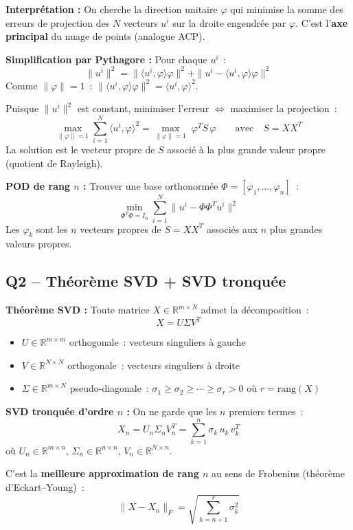 \documentclass[11pt,a4paper]{article}
\begin{document}
\begin{formulabox}[Solution]
\textbf{Interpr\'etation :} On cherche la direction unitaire $\varphi$ qui minimise la somme des erreurs de projection des $N$ vecteurs $u^i$ sur la droite engendr\'ee par $\varphi$. C'est l'\textbf{axe principal} du nuage de points (analogue ACP).

\medskip
\textbf{Simplification par Pythagore :} Pour chaque $u^i$~:
\[
\|u^i\|^2 = \|\langle u^i,\varphi\rangle\varphi\|^2 + \|u^i - \langle u^i,\varphi\rangle\varphi\|^2
\]
Comme $\|\varphi\|=1$~: $\|\langle u^i,\varphi\rangle\varphi\|^2 = \langle u^i,\varphi\rangle^2$.

Puisque $\|u^i\|^2$ est constant, minimiser l'erreur $\Leftrightarrow$ maximiser la projection~:
\[
\boxed{\max_{\|\varphi\|=1} \sum_{i=1}^{N} \langle u^i,\varphi\rangle^2 = \max_{\|\varphi\|=1}\; \varphi^T S\,\varphi} \qquad\text{avec}\quad S = XX^T
\]
La solution est le vecteur propre de $S$ associ\'e \`a la plus grande valeur propre (quotient de Rayleigh).

\medskip
\textbf{POD de rang $n$ :} Trouver une base orthonorm\'ee $\Phi = [\varphi_1,\ldots,\varphi_n]$~:
\[
\boxed{\min_{\Phi^T\Phi = I_n} \sum_{i=1}^{N} \|u^i - \Phi\Phi^Tu^i\|^2}
\]
Les $\varphi_k$ sont les $n$ vecteurs propres de $S = XX^T$ associ\'es aux $n$ plus grandes valeurs propres.
\end{formulabox}

\subsection{Q2 -- Th\'eor\`eme SVD + SVD tronqu\'ee}

\begin{formulabox}[Solution]
\textbf{Th\'eor\`eme SVD :} Toute matrice $X \in \mathbb{R}^{m\times N}$ admet la d\'ecomposition~:
\[
\boxed{X = U\Sigma V^T}
\]
\begin{itemize}[nosep]
\item $U \in \mathbb{R}^{m\times m}$ orthogonale~: vecteurs singuliers \`a gauche
\item $V \in \mathbb{R}^{N\times N}$ orthogonale~: vecteurs singuliers \`a droite
\item $\Sigma \in \mathbb{R}^{m\times N}$ pseudo-diagonale~: $\sigma_1 \geq \sigma_2 \geq \cdots \geq \sigma_r > 0$ o\`u $r = \text{rang}(X)$
\end{itemize}

\medskip
\textbf{SVD tronqu\'ee d'ordre $n$ :} On ne garde que les $n$ premiers termes~:
\[
\boxed{X_n = U_n\Sigma_n V_n^T = \sum_{k=1}^{n} \sigma_k\, u_k\, v_k^T}
\]
o\`u $U_n \in \mathbb{R}^{m\times n}$, $\Sigma_n \in \mathbb{R}^{n\times n}$, $V_n \in \mathbb{R}^{N\times n}$.

C'est la \textbf{meilleure approximation de rang $n$} au sens de Frobenius (th\'eor\`eme d'Eckart--Young)~:
\[
\|X - X_n\|_F = \sqrt{\sum_{k=n+1}^{r} \sigma_k^2}
\]
\end{formulabox}
\end{document}
